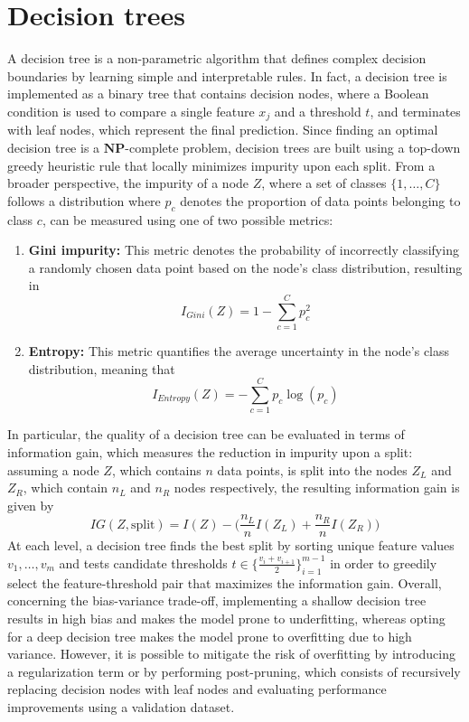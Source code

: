 \documentclass{report}
\begin{document}
\section{Decision trees}
A decision tree is a non-parametric algorithm that defines complex decision boundaries by learning simple and interpretable rules. \newline
In fact, a decision tree is implemented as a binary tree that contains decision nodes, where a Boolean condition is used to compare a single feature $\displaystyle x_j$ and a threshold $\displaystyle t$, and terminates with leaf nodes, which represent the final prediction. \newline
Since finding an optimal decision tree is a $\displaystyle \mathbf{NP}$-complete problem, decision trees are built using a top-down greedy heuristic rule that locally minimizes impurity upon each split. \newline
From a broader perspective, the impurity of a node $\displaystyle Z$, where a set of classes $\displaystyle \{1, \dots, C\}$ follows a distribution where $\displaystyle p_c$ denotes the proportion of data points belonging to class $\displaystyle c$, can be measured using one of two possible metrics:
\begin{enumerate}
    \item \textbf{Gini impurity: }This metric denotes the probability of incorrectly classifying a randomly chosen data point based on the node's class distribution, resulting in
    \[I_{Gini}(Z) = 1 - \sum_{c = 1}^C p_c^2\]
    \item \textbf{Entropy: }This metric quantifies the average uncertainty in the node's class distribution, meaning that
    \[I_{Entropy}(Z) = -\sum_{c = 1}^C p_c\log(p_c)\]
\end{enumerate}
In particular, the quality of a decision tree can be evaluated in terms of information gain, which measures the reduction in impurity upon a split: assuming a node $\displaystyle Z$, which contains $\displaystyle n$ data points, is split into the nodes $\displaystyle Z_L$ and $\displaystyle Z_R$, which contain $\displaystyle n_L$ and $\displaystyle n_R$ nodes respectively, the resulting information gain is given by
\[IG(Z, \text{split}) = I(Z) - \Bigg(\frac{n_L}{n}I(Z_L) + \frac{n_R}{n}I(Z_R)\Bigg)\]
At each level, a decision tree finds the best split by sorting unique feature values $\displaystyle v_1, \dots, v_m$ and tests candidate thresholds $\displaystyle t \in \Bigg\{\frac{v_i + v_{i + 1}}{2}\Bigg\}_{i = 1}^{m - 1}$ in order to greedily select the feature-threshold pair that maximizes the information gain. \newline
Overall, concerning the bias-variance trade-off, implementing a shallow decision tree results in high bias and makes the model prone to underfitting, whereas opting for a deep decision tree makes the model prone to overfitting due to high variance. \newline
However, it is possible to mitigate the risk of overfitting by introducing a regularization term or by performing post-pruning, which consists of recursively replacing decision nodes with leaf nodes and evaluating performance improvements using a validation dataset.
\end{document}
